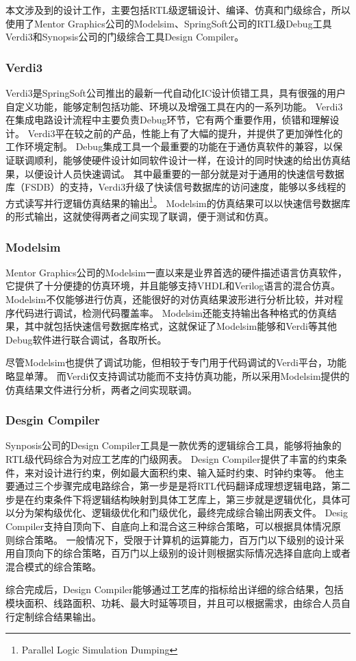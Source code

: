 \documentclass[UTF8]{ctexart}
\begin{document}
本文涉及到的设计工作，主要包括RTL级逻辑设计、编译、仿真和门级综合，所以使用了Mentor Graphics公司的Modelsim、SpringSoft公司的RTL级Debug工具Verdi3和Synopsis公司的门级综合工具Design Compiler。

\subsubsection{Verdi3}

Verdi3是SpringSoft公司推出的最新一代自动化IC设计侦错工具，具有很强的用户自定义功能，能够定制包括功能、环境以及增强工具在内的一系列功能\cite{lun2012}。
Verdi3在集成电路设计流程中主要负责Debug环节，它有两个重要作用，侦错和理解设计。
Verdi3平在较之前的产品，性能上有了大幅的提升，并提供了更加弹性化的工作环境定制。
Debug集成工具一个最重要的功能在于通仿真软件的兼容，以保证联调顺利，能够使硬件设计如同软件设计一样，在设计的同时快速的给出仿真结果，以便设计人员快速调试。
其中最重要的一部分就是对于通用的快速信号数据库（FSDB）的支持，Verdi3升级了快读信号数据库的访问速度，能够以多线程的方式读写并行逻辑仿真结果的输出\footnote{Parallel Logic Simulation Dumping}。
Modelsim的仿真结果可以以快速信号数据库的形式输出，这就使得两者之间实现了联调，便于测试和仿真。

\subsubsection{Modelsim}

Mentor Graphics公司的Modelsim一直以来是业界首选的硬件描述语言仿真软件，它提供了十分便捷的仿真环境，并且能够支持VHDL和Verilog语言的混合仿真\cite{fanj2010}。
Modelsim不仅能够进行仿真，还能很好的对仿真结果波形进行分析比较，并对程序代码进行调试，检测代码覆盖率。
Modelsim还能支持输出各种格式的仿真结果，其中就包括快速信号数据库格式，这就保证了Modelsim能够和Verdi等其他Debug软件进行联合调试，各取所长。

尽管Modelsim也提供了调试功能，但相较于专门用于代码调试的Verdi平台，功能略显单薄。
而Verdi仅支持调试功能而不支持仿真功能，所以采用Modelsim提供的仿真结果文件进行分析，两者之间实现联调。

\subsubsection{Desgin Compiler}

Synposis公司的Design Compiler工具是一款优秀的逻辑综合工具，能够将抽象的RTL级代码综合为对应工艺库的门级网表。
Design Compiler提供了丰富的约束条件，来对设计进行约束，例如最大面积约束、输入延时约束、时钟约束等。
他主要通过三个步骤完成电路综合，第一步是是将RTL代码翻译成理想逻辑电路，第二步是在约束条件下将逻辑结构映射到具体工艺库上，第三步就是逻辑优化，具体可以分为架构级优化、逻辑级优化和门级优化，最终完成综合输出网表文件\cite{yangg2010}。
Desig Compiler支持自顶向下、自底向上和混合这三种综合策略，可以根据具体情况原则综合策略。
一般情况下，受限于计算机的运算能力，百万门以下级别的设计采用自顶向下的综合策略，百万门以上级别的设计则根据实际情况选择自底向上或者混合模式的综合策略。

综合完成后，Design Compiler能够通过工艺库的指标给出详细的综合结果，包括模块面积、线路面积、功耗、最大时延等项目，并且可以根据需求，由综合人员自行定制综合结果输出。


\end{document}
